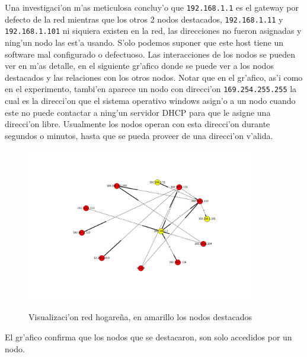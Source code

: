 Una investigaci'on m'as meticulosa concluy'o que \texttt{192.168.1.1} es el gateway por defecto de la red mientras que los otros 2 nodos
destacados, \texttt{192.168.1.11} y \texttt{192.168.1.101} ni siquiera existen en la red, las direcciones no fueron asignadas y ning'un
nodo las est'a usando. S'olo podemos
suponer que este host tiene un software mal configurado o defectuoso.
Las interacciones de los nodos se pueden ver en m'as detalle, en el siguiente gr'afico donde se puede ver a los nodos destacados
y las relaciones con los otros nodos. Notar que en el gr'afico, as'i como en el experimento, tambi'en aparece un nodo con direcci'on 
\texttt{169.254.255.255} la cual es la direcci'on que el sistema operativo windows asign'o a un nodo cuando este no puede
contactar a ning'un servidor DHCP para que le asigne una direcci'on libre. Usualmente los nodos operan con esta direcci'on durante
segundos o minutos, hasta que se pueda proveer de una direcci'on v'alida.

\begin{figure}[!h]
\centering
\caption{Visualizaci'on red hogare\~na, en amarillo los nodos destacados}
\includegraphics[width=0.9\textwidth]{red1_red}
 \label{fig:red1net}
\end{figure}

El gr'afico confirma que los nodos que se destacaron, son solo accedidos por un nodo.\\
